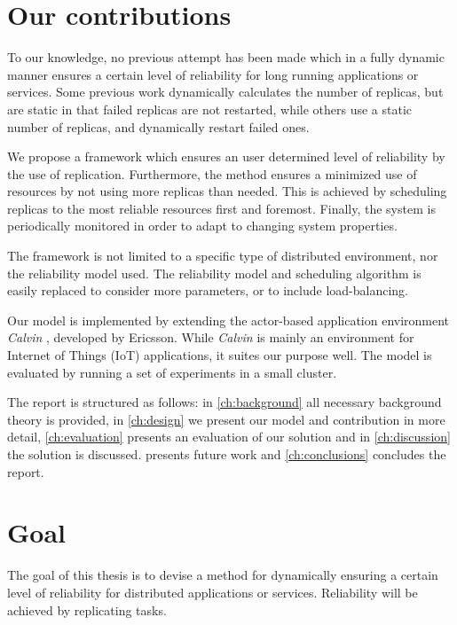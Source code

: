 \documentclass{cslthse-msc}
\begin{document}
\section{Our contributions} \label{sec:introduction_contributions}
To our knowledge, no previous attempt has been made which in a fully dynamic manner ensures a certain level of reliability for long running applications or services. Some previous work dynamically calculates the number of replicas, but are static in that failed replicas are not restarted, while others use a static number of replicas, and dynamically restart failed ones.

We propose a framework which ensures an user determined level of reliability by the use of replication. Furthermore, the method ensures a minimized use of resources by not using more replicas than needed. This is achieved by scheduling replicas to the most reliable resources first and foremost. Finally, the system is periodically monitored in order to adapt to changing system properties.

The framework is not limited to a specific type of distributed environment, nor the reliability model used. The reliability model and scheduling algorithm is easily replaced to consider more parameters, or to include load-balancing.


Our model is implemented by extending the actor-based application environment \emph{Calvin} \cite{calvin}, developed by Ericsson. While \emph{Calvin} is mainly an environment for Internet of Things (IoT) applications, it suites our purpose well. The model is evaluated by running a set of experiments in a small cluster. %

The report is structured as follows: in \cref{ch:background} all necessary background theory is provided, in \cref{ch:design} we present our model and contribution in more detail, \cref{ch:evaluation} presents an evaluation of our solution and in \cref{ch:discussion} the solution is discussed.  presents future work and \cref{ch:conclusions} concludes the report. 

\section{Goal} \label{sec:introduction_goals}
The goal of this thesis is to devise a method for dynamically ensuring a certain level of reliability for distributed applications or services. Reliability will be achieved by replicating tasks.
\end{document}
